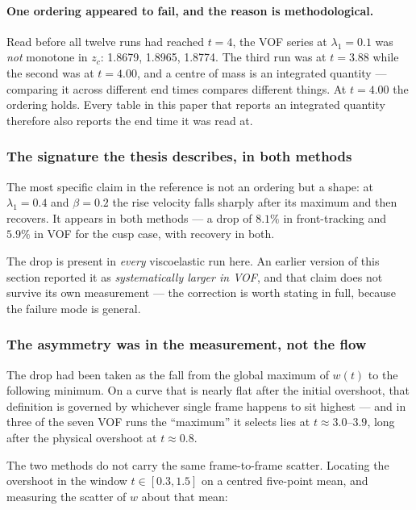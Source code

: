 \paragraph{One ordering appeared to fail, and the reason is methodological.}
Read before all twelve runs had reached $t=4$, the VOF series at
$\lambda_1 = 0.1$ was \emph{not} monotone in $z_c$: 1.8679, 1.8965, 1.8774. The
third run was at $t = 3.88$ while the second was at $t = 4.00$, and a centre of
mass is an integrated quantity --- comparing it across different end times
compares different things. At $t = 4.00$ the ordering holds. Every table in this
paper that reports an integrated quantity therefore also reports the end time it
was read at.

\subsubsection{The signature the thesis describes, in both methods}

The most specific claim in the reference is not an ordering but a shape: at
$\lambda_1 = 0.4$ and $\beta = 0.2$ the rise velocity falls sharply after its
maximum and then recovers. It appears in both methods --- a drop of $8.1\%$ in
front-tracking and $5.9\%$ in VOF for the cusp case, with recovery in both.

The drop is present in \emph{every} viscoelastic run here. An earlier version of
this section reported it as \emph{systematically larger in VOF}, and that claim
does not survive its own measurement --- the correction is worth stating in full,
because the failure mode is general.

\subsubsection{The asymmetry was in the measurement, not the flow}
\label{sec:dropdef}

The drop had been taken as the fall from the global maximum of $w(t)$ to the
following minimum. On a curve that is nearly flat after the initial overshoot,
that definition is governed by whichever single frame happens to sit highest ---
and in three of the seven VOF runs the ``maximum'' it selects lies at
$t \approx 3.0$--$3.9$, long after the physical overshoot at $t \approx 0.8$.

The two methods do not carry the same frame-to-frame scatter. Locating the
overshoot in the window $t \in [0.3,1.5]$ on a centred five-point mean, and
measuring the scatter of $w$ about that mean:

